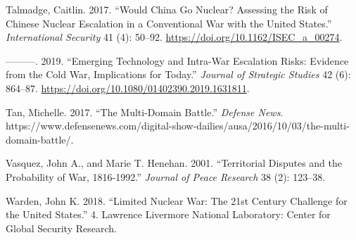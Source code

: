 \documentclass[
]{article}
\newlength{\cslhangindent}
\newlength{\cslentryspacingunit} %
\newenvironment{CSLReferences}[2] %
 {%
  \setlength{\parindent}{0pt}
  \ifodd #1
  \let\oldpar\par
  \def\par{\hangindent=\cslhangindent\oldpar}
  \fi
  \setlength{\parskip}{#2\cslentryspacingunit}
 }%
 {}
\begin{document}
\begin{CSLReferences}{1}{0}
\leavevmode{}%
Talmadge, Caitlin. 2017. {``Would {China Go Nuclear}? {Assessing} the {Risk} of {Chinese Nuclear Escalation} in a {Conventional War} with the {United States}.''} \emph{International Security} 41 (4): 50--92. \url{https://doi.org/10.1162/ISEC_a_00274}.

\leavevmode{}%
---------. 2019. {``Emerging Technology and Intra-War Escalation Risks: {Evidence} from the {Cold War}, Implications for Today.''} \emph{Journal of Strategic Studies} 42 (6): 864--87. \url{https://doi.org/10.1080/01402390.2019.1631811}.

\leavevmode{}%
Tan, Michelle. 2017. {``The {Multi-Domain Battle}.''} \emph{Defense News}. https://www.defensenews.com/digital-show-dailies/ausa/2016/10/03/the-multi-domain-battle/.

\leavevmode{}%
Vasquez, John A., and Marie T. Henehan. 2001. {``Territorial {Disputes} and the {Probability} of {War}, 1816-1992.''} \emph{Journal of Peace Research} 38 (2): 123--38.

\leavevmode{}%
Warden, John K. 2018. {``Limited {Nuclear War}: {The} 21st {Century Challenge} for the {United States}.''} 4. {Lawrence Livermore National Laboratory}: {Center for Global Security Research}.

\end{CSLReferences}
\end{document}

